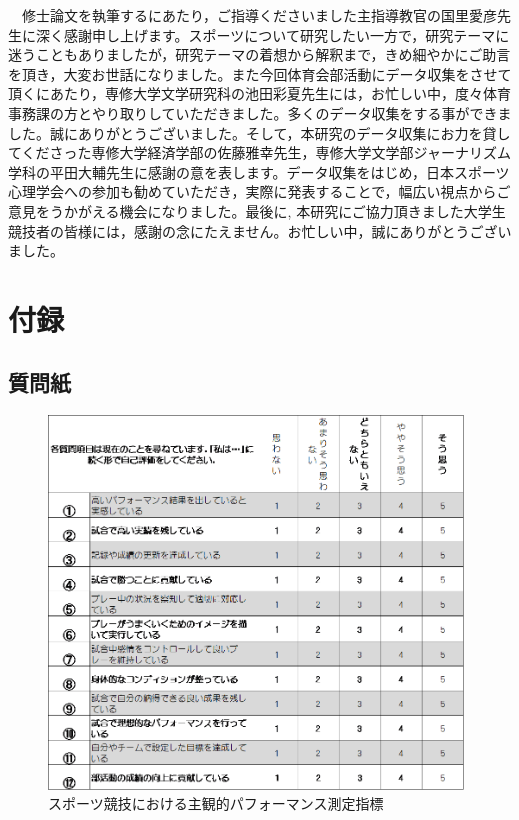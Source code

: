 \documentclass[12pt,a4paper,xelatex,ja=standard]{bxjsarticle}
\begin{document}
　修士論文を執筆するにあたり，ご指導くださいました主指導教官の国里愛彦先生に深く感謝申し上げます。スポーツについて研究したい一方で，研究テーマに迷うこともありましたが，研究テーマの着想から解釈まで，きめ細やかにご助言を頂き，大変お世話になりました。また今回体育会部活動にデータ収集をさせて頂くにあたり，専修大学文学研究科の池田彩夏先生には，お忙しい中，度々体育事務課の方とやり取りしていただきました。多くのデータ収集をする事ができました。誠にありがとうございました。そして，本研究のデータ収集にお力を貸してくださった専修大学経済学部の佐藤雅幸先生，専修大学文学部ジャーナリズム学科の平田大輔先生に感謝の意を表します。データ収集をはじめ，日本スポーツ心理学会への参加も勧めていただき，実際に発表することで，幅広い視点からご意見をうかがえる機会になりました。最後に,
本研究にご協力頂きました大学生競技者の皆様には，感謝の念にたえません。お忙しい中，誠にありがとうございました。

\hypertarget{ux4ed8ux9332}{%
\section{付録}\label{ux4ed8ux9332}}

\hypertarget{ux8ceaux554fux7d19}{%
\subsection{質問紙}\label{ux8ceaux554fux7d19}}

\begin{figure}[H]
\centering
\includegraphics[clip,width = 11cm]{question/sq.png}
\caption{スポーツ競技における主観的パフォーマンス測定指標}
\end{figure}
\end{document}
